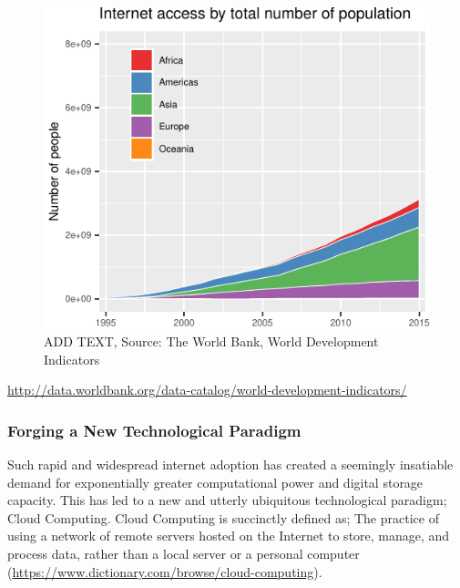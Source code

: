 \documentclass[11pt,]{article}
\begin{document}
\begin{figure}[H]

{\centering \includegraphics{MD_Final_files/figure-latex/internetAccessPlot-1} 

}

\caption{ADD TEXT, Source: The World Bank, World Development Indicators}\label{fig:internetAccessPlot}
\end{figure}

\url{http://data.worldbank.org/data-catalog/world-development-indicators/}

\hypertarget{forging-a-new-technological-paradigm}{%
\subsubsection{Forging a New Technological
Paradigm}\label{forging-a-new-technological-paradigm}}

Such rapid and widespread internet adoption has created a seemingly
insatiable demand for exponentially greater computational power and
digital storage capacity. This has led to a new and utterly ubiquitous
technological paradigm; Cloud Computing. Cloud Computing is succinctly
defined as; The practice of using a network of remote servers hosted on
the Internet to store, manage, and process data, rather than a local
server or a personal computer
(\url{https://www.dictionary.com/browse/cloud-computing}).
\end{document}
